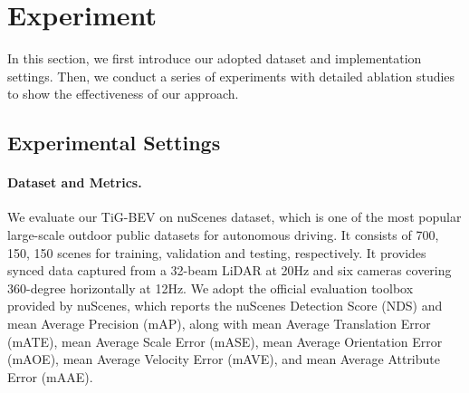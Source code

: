 
\vspace{0.2cm}
\section{Experiment}
\label{sec:experiment}
In this section, we first introduce our adopted dataset and implementation settings. Then, we conduct a series of experiments with detailed ablation studies to show the effectiveness of our approach.

\subsection{Experimental Settings}
\paragraph{Dataset and Metrics.}
We evaluate our TiG-BEV on nuScenes dataset\cite{b6}, which is one of the most popular large-scale outdoor public datasets for autonomous driving. It consists of 700, 150, 150 scenes for training, validation and testing, respectively. It provides synced data captured from a 32-beam LiDAR at 20Hz and six cameras covering 360-degree horizontally at 12Hz. We adopt the official evaluation toolbox provided by nuScenes, which reports the nuScenes Detection Score (NDS) and mean Average Precision (mAP), along with mean Average Translation Error (mATE), mean Average Scale Error (mASE), mean Average Orientation Error (mAOE), mean Average Velocity Error (mAVE), and mean Average Attribute Error (mAAE).

